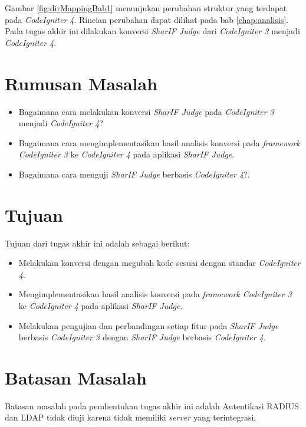 Gambar \ref{fig:dirMappingBab1} menunjukan perubahan struktur yang terdapat pada \textit{CodeIgniter 4}. Rincian perubahan dapat dilihat pada bab \ref{chap:analisis}. Pada tugas akhir ini dilakukan konversi \textit{SharIF Judge} dari \textit{CodeIgniter 3} menjadi \textit{CodeIgniter 4}.

\section{Rumusan Masalah}
\label{sec:rumusan}
\begin{itemize}
	\item Bagaimana cara melakukan konversi \textit{SharIF Judge} pada \textit{CodeIgniter 3} menjadi \textit{CodeIgniter 4}? 
	\item Bagaimana cara mengimplementasikan hasil analisis konversi pada \textit{framework CodeIgniter 3} ke \textit{CodeIgniter 4} pada aplikasi \textit{SharIF Judge}.
		\item Bagaimana cara menguji \textit{SharIF Judge} berbasis \textit{CodeIgniter 4}?.
\end{itemize}
\section{Tujuan}
\label{sec:tujuan}
Tujuan dari tugas akhir ini adalah sebagai berikut:
\begin{itemize}
	\item Melakukan konversi dengan megubah kode sesuai dengan standar \textit{CodeIgniter 4}.
	\item Mengimplementasikan hasil analisis konversi pada \textit{framework CodeIgniter 3} ke \textit{CodeIgniter 4} pada aplikasi \textit{SharIF Judge}.
	\item Melakukan pengujian dan perbandingan setiap fitur pada \textit{SharIF Judge} berbasis \textit{CodeIgniter 3} dengan \textit{SharIF Judge} berbasis \textit{CodeIgniter 4}.
\end{itemize}

\section{Batasan Masalah}
\label{sec:batasan}
Batasan masalah pada pembentukan tugas akhir ini adalah Autentikasi RADIUS dan LDAP tidak diuji karena tidak memiliki \textit{server} yang terintegrasi.

